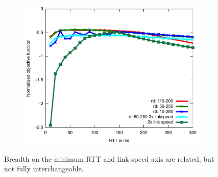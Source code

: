\begin{figure}
\begin{subfigure}[b]{0.33\textwidth}
\includegraphics[width=\textwidth]{figures/rtt-robust-util.pdf}
\end{subfigure}
\caption{Breadth on the minimum RTT and link speed axis are related,
  but not fully interchangeable.}
\label{fig:rtt-robustness}
\end{figure}

